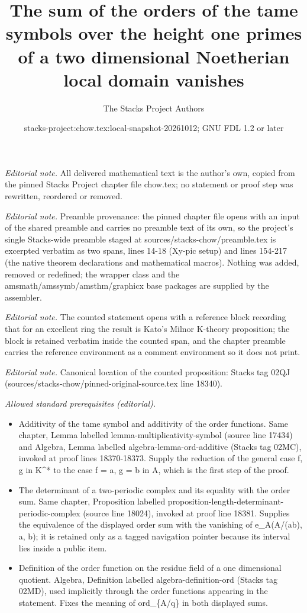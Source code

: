 \documentclass[10pt,a4paper]{amsart}
\title{The sum of the orders of the tame symbols over the height one primes of a two dimensional Noetherian local domain vanishes}
\author{The Stacks Project Authors}
\date{stacks-project:chow.tex:local-snapshot-20261012; GNU FDL 1.2 or later}
\theoremstyle{plain}
\theoremstyle{definition}
\theoremstyle{remark}
\numberwithin{equation}{subsection}
\begin{document}
\maketitle
\noindent\textit{Editorial note.} All delivered mathematical text is the author's own, copied from the pinned Stacks Project chapter file chow.tex; no statement or proof step was rewritten, reordered or removed.\par\medskip
\noindent\textit{Editorial note.} Preamble provenance: the pinned chapter file opens with an input of the shared preamble and carries no preamble text of its own, so the project's single Stacks-wide preamble staged at sources/stacks-chow/preamble.tex is excerpted verbatim as two spans, lines 14-18 (Xy-pic setup) and lines 154-217 (the native theorem declarations and mathematical macros). Nothing was added, removed or redefined; the wrapper class and the amsmath/amssymb/amsthm/graphicx base packages are supplied by the assembler.\par\medskip
\noindent\textit{Editorial note.} The counted statement opens with a reference block recording that for an excellent ring the result is Kato's Milnor K-theory proposition; the block is retained verbatim inside the counted span, and the chapter preamble carries the reference environment as a comment environment so it does not print.\par\medskip
\noindent\textit{Editorial note.} Canonical location of the counted proposition: Stacks tag 02QJ (sources/stacks-chow/pinned-original-source.tex line 18340).\par\medskip
\noindent\textit{Allowed standard prerequisites (editorial).}\begin{itemize}
\item Additivity of the tame symbol and additivity of the order functions. Same chapter, Lemma labelled lemma-multiplicativity-symbol (source line 17434) and Algebra, Lemma labelled algebra-lemma-ord-additive (Stacks tag 02MC), invoked at proof lines 18370-18373. Supply the reduction of the general case f, g in K\textasciicircum{}* to the case f = a, g = b in A, which is the first step of the proof.
\item The determinant of a two-periodic complex and its equality with the order sum. Same chapter, Proposition labelled proposition-length-determinant-periodic-complex (source line 18024), invoked at proof line 18381. Supplies the equivalence of the displayed order sum with the vanishing of e\_A(A/(ab), a, b); it is retained only as a tagged navigation pointer because its interval lies inside a public item.
\item Definition of the order function on the residue field of a one dimensional quotient. Algebra, Definition labelled algebra-definition-ord (Stacks tag 02MD), used implicitly through the order functions appearing in the statement. Fixes the meaning of ord\_\{A/q\} in both displayed sums.
\end{itemize}\medskip
\end{document}
